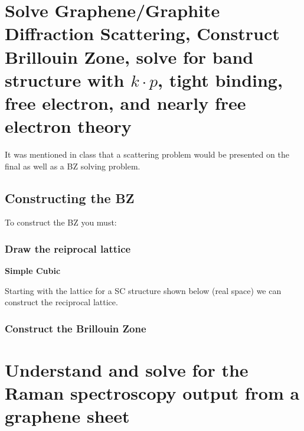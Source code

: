 \documentclass{article}
\begin{document}
	\section{Solve Graphene/Graphite Diffraction Scattering, Construct Brillouin Zone, solve for band structure with $k\cdot p$, tight binding, free electron, and nearly free electron theory}
		
		It was mentioned in class that a scattering problem would be presented on the final as well as a BZ solving problem.  		
			
		\subsection{Constructing the BZ}
			To construct the BZ you must:
			\subsubsection{Draw the reiprocal lattice}
				\textbf{Simple Cubic}

					Starting with the lattice for a SC structure shown below (real space) we can construct the reciprocal lattice.
				

				
									

			\subsubsection{Construct the Brillouin Zone}

			
	\section{Understand and solve for the Raman spectroscopy output from a graphene sheet}
		
\end{document}
